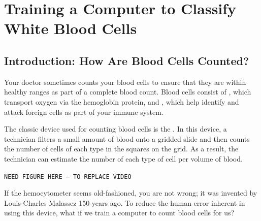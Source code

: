 \chapter[Training a Computer to Classify White Blood Cells]{Training a Computer to Classify White Blood Cells}
\label{chapter:white_blood_cells}
\renewcommand{\chaptertitle}{Training a Computer to Classify White Blood Cells}



\FloatBarrier

\section{Introduction: How Are Blood Cells Counted?}
\label{sec:introduction}

Your doctor sometimes counts your blood cells to ensure that they are within healthy ranges as part of a complete blood count. Blood cells consist of , which transport oxygen via the hemoglobin protein, and , which help identify and attack foreign cells as part of your immune system.

The classic device used for counting blood cells is the . In this device, a technician filters a small amount of blood onto a gridded slide and then counts the number of cells of each type in the squares on the grid. As a result, the technician can estimate the number of each type of cell per volume of blood.

\texttt{NEED FIGURE HERE -- TO REPLACE VIDEO}

\begin{qbox}\end{qbox}

If the hemocytometer seems old-fashioned, you are not wrong; it was invented by Louis-Charles Malassez 150 years ago. To reduce the human error inherent in using this device, what if we train a computer to count blood cells for us?

